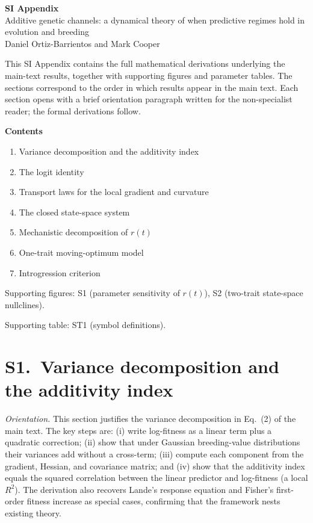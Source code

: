 \documentclass[11pt]{article}
\begin{document}

\begin{center}
  {\Large\bfseries SI Appendix}\\[0.6em]
  {\large Additive genetic channels: a dynamical theory of when
   predictive regimes hold in evolution and breeding}\\[0.4em]
  {\normalsize Daniel Ortiz-Barrientos and Mark Cooper}
\end{center}

\medskip

\noindent
This SI Appendix contains the full mathematical derivations
underlying the main-text results, together with supporting figures
and parameter tables.
The sections correspond to the order in which results appear in
the main text.
Each section opens with a brief orientation paragraph written for
the non-specialist reader; the formal derivations follow.

\bigskip

\noindent\textbf{Contents}

\begin{enumerate}
  \item Variance decomposition and the additivity index
  \item The logit identity
  \item Transport laws for the local gradient and curvature
  \item The closed state-space system
  \item Mechanistic decomposition of $r(t)$
  \item One-trait moving-optimum model
  \item Introgression criterion
\end{enumerate}

Supporting figures: S1 (parameter sensitivity of $r(t)$),
S2 (two-trait state-space nullclines).

Supporting table: ST1 (symbol definitions).

\section*{S1.~Variance decomposition and the additivity index}
\label{sec:decomp}

\noindent\textit{Orientation.}
This section justifies the variance decomposition in
Eq.~(2) of the main text.
The key steps are: (i) write log-fitness as a linear term plus a
quadratic correction; (ii) show that under Gaussian breeding-value
distributions their variances add without a cross-term;
(iii) compute each component from the gradient, Hessian, and
covariance matrix; and (iv) show that the additivity index equals
the squared correlation between the linear predictor and
log-fitness (a local $R^2$).
The derivation also recovers Lande's response equation and
Fisher's first-order fitness increase as special cases, confirming
that the framework nests existing theory.
\end{document}
